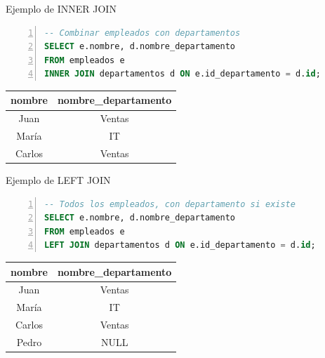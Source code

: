 \documentclass{beamer}
\begin{document}
\begin{frame}[fragile]{Ejemplo de INNER JOIN}
    \begin{lstlisting}[language=SQL, numbers=left, numbersep=5pt]
-- Combinar empleados con departamentos
SELECT e.nombre, d.nombre_departamento
FROM empleados e
INNER JOIN departamentos d ON e.id_departamento = d.id;
    \end{lstlisting}
    
    \vspace{0.3cm}
    
    \begin{center}
        \begin{tabular}{cc}
            \toprule
            nombre & nombre\_departamento \\
            \midrule
            Juan & Ventas \\
            María & IT \\
            Carlos & Ventas \\
            \bottomrule
        \end{tabular}
    \end{center}
\end{frame}

\begin{frame}[fragile]{Ejemplo de LEFT JOIN}
    \begin{lstlisting}[language=SQL, numbers=left, numbersep=5pt]
-- Todos los empleados, con departamento si existe
SELECT e.nombre, d.nombre_departamento
FROM empleados e
LEFT JOIN departamentos d ON e.id_departamento = d.id;
    \end{lstlisting}
    
    \vspace{0.3cm}
    
    \begin{center}
        \begin{tabular}{cc}
            \toprule
            nombre & nombre\_departamento \\
            \midrule
            Juan & Ventas \\
            María & IT \\
            Carlos & Ventas \\
            Pedro & NULL \\
            \bottomrule
        \end{tabular}
    \end{center}
\end{frame}
\end{document}
